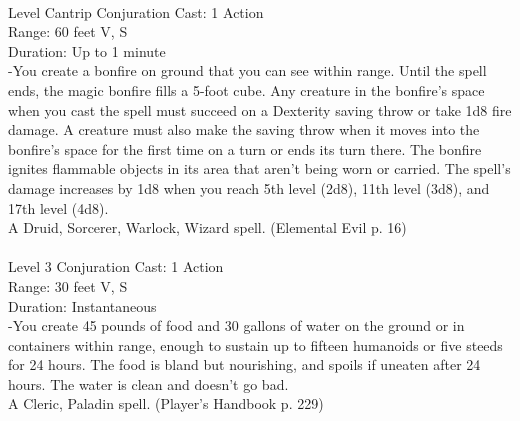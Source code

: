 \documentclass[10pt,twocolumn]{report}
\begin{document}
 \\
Level Cantrip \quad Conjuration \quad Cast: 1 Action\\
Range: 60 feet \quad V, S\\
Duration: Up to 1 minute \quad \\
-You create a bonfire on ground that you can see within range. Until the spell ends, the magic bonfire fills a 5-foot cube. Any creature in the bonfire’s space when you cast the spell must succeed on a Dexterity saving throw or take 1d8 fire damage. A creature must also make the saving throw when it moves into the bonfire’s space for the first time on a turn or ends its turn there.
The bonfire ignites flammable objects in its area that aren’t being worn or carried.
The spell’s damage increases by 1d8 when you reach 5th level (2d8), 11th level (3d8), and 17th level (4d8).\\
A Druid, Sorcerer, Warlock, Wizard spell. (Elemental Evil p. 16) \\


 \\
Level 3 \quad Conjuration \quad Cast: 1 Action\\
Range: 30 feet \quad V, S\\
Duration: Instantaneous \quad \\
-You create 45 pounds of food and 30 gallons of water on the ground or in containers within range, enough to sustain up to fifteen humanoids or five steeds for 24 hours. The food is bland but nourishing, and spoils if uneaten after 24 hours. The water is clean and doesn’t go bad.\\
A Cleric, Paladin spell. (Player's Handbook p. 229) \\
\end{document}
